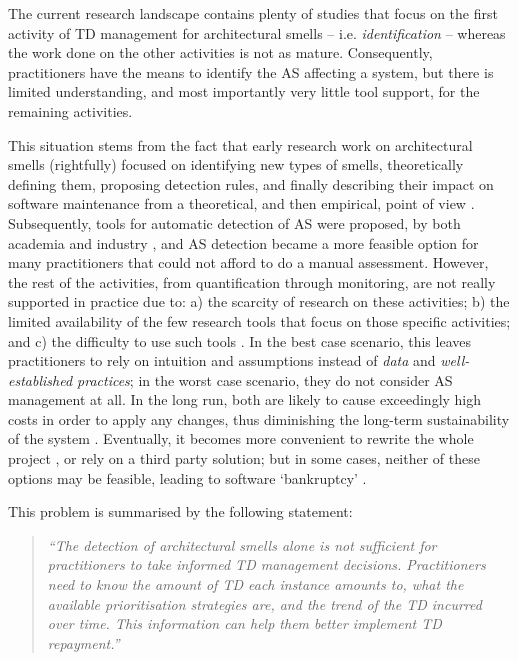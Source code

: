 The current research landscape contains plenty of studies that focus on the first activity of TD management for architectural smells -- i.e.  \emph{identification} -- whereas the work done on the other activities is not as mature.
Consequently, practitioners have the means to identify the AS affecting a system, but there is limited understanding, and most importantly very little tool support, for the remaining activities.

This situation stems from the fact that early research work on architectural smells (rightfully) focused on identifying new types of smells, theoretically defining them, proposing detection rules, and finally describing their impact on software maintenance from a theoretical, and then empirical, point of view \cite{Lippert2006,Garcia2009,Mo2015,Le2016,Arcelli2016}.
Subsequently, tools for automatic detection of AS were proposed, by both academia and industry \cite{Avgeriou2021,Khomyakov2020}, and AS detection became a more feasible option for many practitioners that could not afford to do a manual assessment.
However, the rest of the activities, from quantification through monitoring, are not really supported in practice due to: a) the scarcity of research on these activities; b) the limited availability of the few research tools that focus on those specific activities; and c) the difficulty to use such tools \cite{Khomyakov2020}.
In the best case scenario, this leaves practitioners to rely on intuition and assumptions instead of \emph{data} and \emph{well-established practices}; in the worst case scenario, they do not consider AS management at all.
In the long run, both are likely to cause exceedingly high costs in order to apply any changes, thus diminishing the long-term sustainability of the system \cite{Winters2020}. 
Eventually, it becomes more convenient to rewrite the whole project \cite{Lehman1979}, or rely on a third party solution; but in some cases, neither of these options may be feasible, leading to software `bankruptcy' \cite{Ampatzoglou2015}.

This problem is summarised by the following statement:
\begin{quote}\itshape
    ``The detection of architectural smells alone is not sufficient for practitioners to take informed TD management decisions.
    Practitioners need to know the amount of TD each instance amounts to, what the available prioritisation strategies are, and the trend of the TD incurred over time. This information can help them better implement TD repayment.''
\end{quote}


